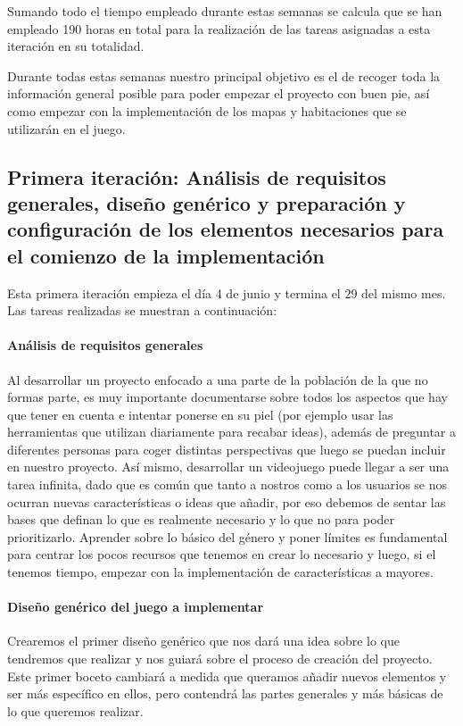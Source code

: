 Sumando todo el tiempo empleado durante estas semanas se calcula que se han empleado 190 horas en total para la realización de las tareas asignadas a esta iteración en su totalidad.

Durante todas estas semanas nuestro principal objetivo es el de recoger toda la información general posible para poder empezar el proyecto con buen pie, así como empezar con la implementación de los mapas y habitaciones que se utilizarán en el juego.

\subsection{Primera iteración: Análisis de requisitos generales, diseño genérico y preparación y configuración de los elementos necesarios para el comienzo de la implementación}

Esta primera iteración empieza el día 4 de junio y termina el 29 del mismo mes. Las tareas realizadas se muestran a continuación:

\paragraph{Análisis de requisitos generales} Al desarrollar un proyecto enfocado a una parte de la población de la que no formas parte, es muy importante documentarse sobre todos los aspectos que hay que tener en cuenta e intentar ponerse en su piel (por ejemplo usar las herramientas que utilizan diariamente para recabar ideas), además de preguntar a diferentes personas para coger distintas perspectivas que luego se puedan incluir en nuestro proyecto.
Así mismo, desarrollar un videojuego puede llegar a ser una tarea infinita, dado que es común que tanto a nostros como a los usuarios se nos ocurran nuevas características o ideas que añadir, por eso debemos de sentar las bases que definan lo que es realmente necesario y lo que no para poder prioritizarlo. 
Aprender sobre lo básico del género y poner límites es fundamental para centrar los pocos recursos que tenemos en crear lo necesario y luego, si el tenemos tiempo, empezar con la implementación de características a mayores.

\paragraph{Diseño genérico del juego a implementar} Crearemos el primer diseño genérico que nos dará una idea sobre lo que tendremos que realizar y nos guiará sobre el proceso de creación del proyecto. Este primer boceto cambiará a medida que queramos añadir nuevos elementos y ser más específico en ellos, pero contendrá las partes generales y más básicas de lo que queremos realizar.


